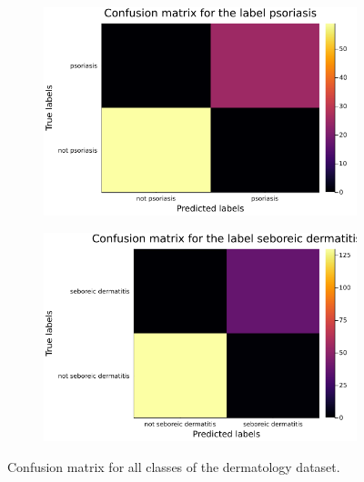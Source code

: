 \documentclass[12pt,a4paper]{article}
\begin{document}
\begin{figure}[H]\ContinuedFloat
    \centering
    \begin{subfigure}{0.6\textwidth}
        \includegraphics[scale=.4]{../trab5 (MLP)/figs/dermatology-psoriasis-confusion-matrix.png}
        \label{subfig:iteme}
    \end{subfigure}
\end{figure}    
\begin{figure}[H]\ContinuedFloat
    \centering
    \begin{subfigure}{0.6\textwidth}
        \includegraphics[scale=.4]{../trab5 (MLP)/figs/dermatology-seboreic dermatitis-confusion-matrix.png}
        \label{subfig:itemf}
    \end{subfigure}

    \caption{Confusion matrix for all classes of the dermatology dataset.}
    \label{fig:dermatology-mlp-confusion-matrix}
\end{figure}
\end{document}
